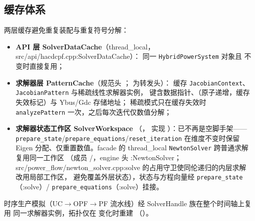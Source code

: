 \subsection{缓存体系}
两层缓存避免重复装配与重复符号分解：
\begin{itemize}
  \item \textbf{API 层 SolverDataCache}（thread\_local，src/api/hacdcpf.cpp:SolverDataCache）：
        同一 \texttt{HybridPowerSystem} 对象且  不变时直接复用；
  \item \textbf{求解器层 PatternCache}（规范头
        ；
         为转发头）：
        缓存 \texttt{JacobianContext}、\texttt{JacobianPattern} 与稀疏线性求解器实例，
        键含数据指针、（原子递增，缓存失效标记）与 Ybus/Gdc 存储地址；
        稀疏模式只在缓存失效时 \texttt{analyzePattern} 一次，之后每次迭代仅数值分解；
  \item \textbf{求解器状态工作区 SolverWorkspace}
        （，
        实现 ）：已不再是空脚手架——
        \texttt{prepare\_state}/\texttt{prepare\_equations}/\texttt{reset\_iteration}
        在维度不变时保留 Eigen 分配、仅重置数值。facade 的 thread\_local
        \texttt{NewtonSolver} 跨普通求解复用同一工作区
        （成员 /，engine 头 :NewtonSolver；
        src/power\_flow/newton\_solver.cpp:solve 的占用守卫使同伦递归的内层求解改用局部工作区，
        避免覆盖外层状态），状态与方程向量经 \texttt{prepare\_state}（:solve）/
        \texttt{prepare\_equations}（:solve）挂接。
\end{itemize}
时序生产模拟（UC$\to$OPF$\to$PF 流水线）经 SolverHandle 族在整个时间轴上复用
同一求解器实例，拓扑仅在  变化时重建
（）。
